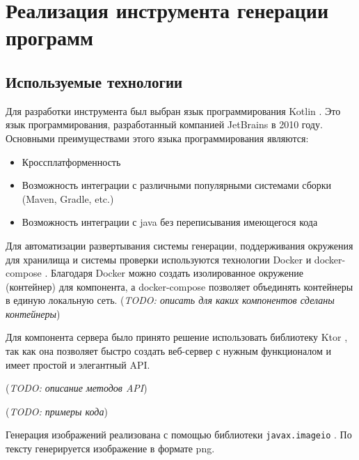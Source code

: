 \section{Реализация инструмента генерации программ}

\subsection{Используемые технологии}

Для разработки инструмента был выбран язык программирования Kotlin \cite{kotlin}. Это язык
программирования, разработанный компанией JetBrains в 2010 году. Основными
преимуществами этого языка программирования являются:
\begin{itemize}
    \item Кроссплатформенность
    \item Возможность интеграции с различными популярными системами сборки
          (Maven, Gradle, etc.)
    \item Возможность интеграции с java без переписывания имеющегося кода
\end{itemize}

Для автоматизации развертывания системы генерации, поддерживания окружения для хранилища и
системы проверки используются технологии Docker \cite{docker} и docker-compose \cite{docker-compose}.
Благодаря Docker можно создать изолированное окружение (контейнер) для компонента, а docker-compose
позволяет объединять контейнеры в единую локальную сеть.
(\textit{TODO: описать для каких компонентов сделаны контейнеры})

Для компонента сервера было принято решение использовать библиотеку Ktor \cite{ktor}, так как
она позволяет быстро создать веб-сервер с нужным функционалом и имеет простой и элегантный API.

(\textit{TODO: описание методов API})

(\textit{TODO: примеры кода})

Генерация изображений реализована с помощью библиотеки \texttt{javax.imageio}
\cite{imageio}. По тексту генерируется изображение в формате png.
